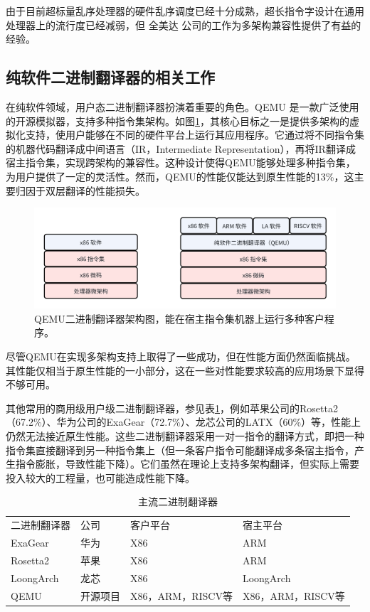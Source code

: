 \documentclass{Style/ucasproposal}%
\begin{document}
由于目前超标量乱序处理器的硬件乱序调度已经十分成熟，超长指令字设计在通用处理器上的流行度已经减弱，但 全美达 公司的工作为多架构兼容性提供了有益的经验。

\subsection{纯软件二进制翻译器的相关工作}

在纯软件领域，用户态二进制翻译器扮演着重要的角色。QEMU 是一款广泛使用的开源模拟器，支持多种指令集架构。如图\ref{img:qemu_arch}，其核心目标之一是提供多架构的虚拟化支持，使用户能够在不同的硬件平台上运行其应用程序。它通过将不同指令集的机器代码翻译成中间语言（IR，Intermediate Representation），再将IR翻译成宿主指令集，实现跨架构的兼容性。这种设计使得QEMU能够处理多种指令集，为用户提供了一定的灵活性。然而，QEMU的性能仅能达到原生性能的13\%，这主要归因于双层翻译的性能损失。

\begin{figure}[h]
  \centering
  \includegraphics[width=0.8\linewidth]{./feishuImage/qemu_arch.png}
  \caption{QEMU二进制翻译器架构图，能在宿主指令集机器上运行多种客户程序。}
  \label{img:qemu_arch}
\end{figure}

尽管QEMU在实现多架构支持上取得了一些成功，但在性能方面仍然面临挑战。其性能仅相当于原生性能的一小部分，这在一些对性能要求较高的应用场景下显得不够可用。

其他常用的商用级用户级二进制翻译器，参见表\ref{tab:BTs}，例如苹果公司的Rosetta2（67.2\%）、华为公司的ExaGear（72.7\%）、龙芯公司的LATX（60\%）等，性能上仍然无法接近原生性能。这些二进制翻译器采用一对一指令的翻译方式，即把一种指令集直接翻译到另一种指令集上（但一条客户指令可能翻译成多条宿主指令，产生指令膨胀，导致性能下降）。它们虽然在理论上支持多架构翻译，但实际上需要投入较大的工程量，也可能造成性能下降。

\begin{table}[]
\centering
\caption{主流二进制翻译器}
\label{tab:BTs}
  \begin{tabular}{llll}
  \rowcolor[HTML]{FBE5D6} 
  二进制翻译器    & 公司   & 客户平台           & 宿主平台           \\
  ExaGear   & 华为   & X86            & ARM            \\
  Rosetta2  & 苹果   & X86            & ARM            \\
  LoongArch & 龙芯   & X86            & LoongArch      \\
  QEMU      & 开源项目 & X86，ARM，RISCV等 & X86，ARM，RISCV等
  \end{tabular}
  \end{table}
\end{document}
